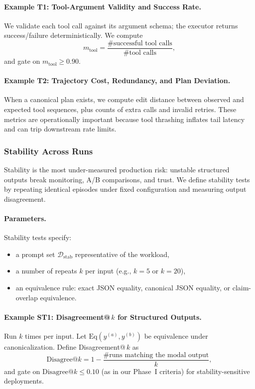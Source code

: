\documentclass[11pt]{article}
\begin{document}
\paragraph{Example T1: Tool-Argument Validity and Success Rate.}
We validate each tool call against its argument schema; the executor returns success/failure deterministically.
We compute
\[
m_{\text{tool}} = \frac{\#\text{successful tool calls}}{\#\text{tool calls}},
\]
and gate on $m_{\text{tool}} \ge 0.90$.

\paragraph{Example T2: Trajectory Cost, Redundancy, and Plan Deviation.}
When a canonical plan exists, we compute edit distance between observed and expected tool sequences, plus counts of extra calls and invalid retries.
These metrics are operationally important because tool thrashing inflates tail latency and can trip downstream rate limits.

\subsubsection{Stability Across Runs}

Stability is the most under-measured production risk: unstable structured outputs break monitoring, A/B comparisons, and trust.
We define stability tests by repeating identical episodes under fixed configuration and measuring output disagreement.

\paragraph{Parameters.}
Stability tests specify:
\begin{itemize}[leftmargin=12pt]
    \item a prompt set $\mathcal{D}_{\text{stab}}$ representative of the workload,
    \item a number of repeats $k$ per input (e.g., $k=5$ or $k=20$),
    \item an equivalence rule: exact JSON equality, canonical JSON equality, or claim-overlap equivalence.
\end{itemize}

\paragraph{Example ST1: Disagreement@\,$k$ for Structured Outputs.}
Run $k$ times per input. Let $\mathrm{Eq}(y^{(a)},y^{(b)})$ be equivalence under canonicalization.
Define Disagreement@\,$k$ as
\[
\mathrm{Disagree}@k = 1 - \frac{\#\text{runs matching the modal output}}{k},
\]
and gate on \(\mathrm{Disagree}@k \le 0.10\) (as in our Phase~I criteria) for stability-sensitive deployments.
\end{document}
